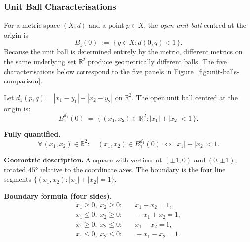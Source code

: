 \subsubsection{Unit Ball Characterisations}
\label{sec:unit-ball-characterisations}

For a metric space $(X, d)$ and a point $p \in X$, the \emph{open unit ball}
centred at the origin is
\[
B_1(0) \;:=\; \bigl\{\, q \in X : d(0, q) < 1 \,\bigr\}.
\]
Because the unit ball is determined entirely by the metric, different metrics on
the same underlying set $\mathbb{R}^2$ produce geometrically different balls.
The five characterisations below correspond to the five panels in
Figure~\ref{fig:unit-balls-comparison}.


\begin{tcolorbox}[colback=propbox, colframe=propborder, arc=2pt,
  left=6pt, right=6pt, top=4pt, bottom=4pt,
  title={\small\textbf{Unit Ball: Taxicab Metric $d_1$ on $\mathbb{R}^2$}},
  fonttitle=\small\bfseries]
\begin{definition}
\label{def:ball-d1}
Let $d_1(p,q) = |x_1-y_1|+|x_2-y_2|$ on $\mathbb{R}^2$.
The open unit ball centred at the origin is:
\[
B_1^{d_1}(0)
\;=\; \bigl\{\,(x_1,x_2)\in\mathbb{R}^2 :
|x_1| + |x_2| < 1\,\bigr\}.
\]

\medskip
\noindent\textbf{Fully quantified.}
\[
\forall\,(x_1,x_2)\in\mathbb{R}^2:\quad
(x_1,x_2)\in B_1^{d_1}(0)
\;\iff\;
|x_1|+|x_2| < 1.
\]

\medskip
\noindent\textbf{Geometric description.}
A square with vertices at $(\pm 1,0)$ and $(0,\pm 1)$, rotated $45°$
relative to the coordinate axes.
The boundary is the four line segments
$\{(x_1,x_2): |x_1|+|x_2|=1\}$.

\medskip
\noindent\textbf{Boundary formula (four sides).}
\begin{align*}
x_1 \ge 0,\; x_2 \ge 0: &\quad x_1 + x_2 = 1, \\
x_1 \le 0,\; x_2 \ge 0: &\quad -x_1 + x_2 = 1, \\
x_1 \ge 0,\; x_2 \le 0: &\quad x_1 - x_2 = 1, \\
x_1 \le 0,\; x_2 \le 0: &\quad -x_1 - x_2 = 1.
\end{align*}
\end{definition}
\end{tcolorbox}

